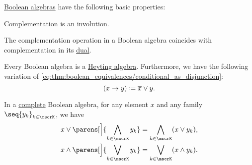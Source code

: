 \begin{proposition}\label{thm:def:boolean_algebra}
  \hyperref[def:boolean_algebra]{Boolean algebras} have the following basic properties:
  \begin{thmenum}
     Complementation is an \hyperref[def:involution]{involution}.

     The complementation operation in a Boolean algebra coincides with complementation in its \hyperref[def:boolean_algebra/opposite]{dual}.

     Every Boolean algebra is a \hyperref[def:heyting_algebra]{Heyting algebra}. Furthermore, we have the following variation of \eqref{eq:thm:boolean_equivalences/conditional_as_disjunction}:
    \begin{equation*}
      (x \rightarrow y) \coloneqq \oline {x} \vee y.
    \end{equation*}

     In a \hyperref[def:complete_lattice]{complete} Boolean algebra, for any element \( x \) and any family \( \seq{ y_k }_{k \in \mscrK} \), we have
    \begin{subequations}
      \begin{align}
        x \vee \parens[\Big]{ \bigwedge_{k \in \mscrK} y_k } &= \bigwedge_{k \in \mscrK} (x \vee y_k), \label{eq:thm:def:boolean_algebra/distributive/join_over_meet} \\
        x \wedge \parens[\Big]{ \bigvee_{k \in \mscrK} y_k } &= \bigvee_{k \in \mscrK} (x \wedge y_k). \label{eq:thm:def:boolean_algebra/distributive/meet_over_join}
      \end{align}
    \end{subequations}
  \end{thmenum}
\end{proposition}
